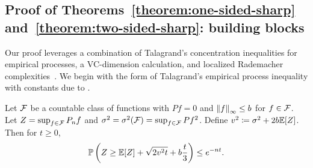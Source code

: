 \documentclass[11pt]{article}
\newcommand{\radphi}{b_{\phi}}
\newcommand{\scorefunc}{s}
\newcommand{\scoreval}{\scorefunc}
\newcommand{\scorerv}{S}
\begin{document}

\subsection{Proof of Theorems~\ref{theorem:one-sided-sharp}
  and~\ref{theorem:two-sided-sharp}: building blocks}
\label{sec:proof-sharp-building-blocks}

Our proof leverages a combination of Talagrand's concentration inequalities
for empirical processes, a VC-dimension calculation, and localized
Rademacher complexities~\cite{BartlettBoMe05, Koltchinskii06a}.
We begin with the form of Talagrand's empirical
process inequality with constants due to \citet{Bousquet02thesis}.

\begin{lemma}
  \label{lemma:talagrand}
  Let $\mathcal{F}$ be a countable class of functions with
  $Pf = 0$ and $\left\|{f}\right\|_\infty \le b$ for $f \in \mathcal{F}$. Let $Z = \sup_{f \in \mathcal{F}}
  P_n f$ and $\sigma^2 = \sigma^2(\mathcal{F}) = \sup_{f \in \mathcal{F}} Pf^2$.
  Define $v^2 \coloneqq \sigma^2 + 2b \mathbb{E}[Z]$.
  Then for $t \ge 0$,
  \begin{equation*}
    \mathbb{P}\left(Z \ge \mathbb{E}[Z] + \sqrt{2 v^2 t} + b\frac{t}{3}\right)
    \le e^{-nt}.
  \end{equation*}
\end{lemma}
\end{document}
